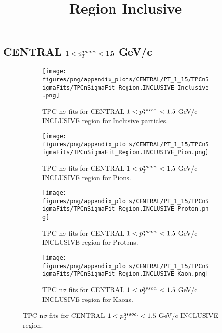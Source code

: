 

    
            \subsection{CENTRAL $1 < \pTassoc < 1.5$ GeV/c}
            \begin{figure}[H]
                \title{Region Inclusive}
                \begin{subfigure}[b]{0.5\textwidth}
                    \centering
                    \texttt{[image: figures/png/appendix\_plots/CENTRAL/PT\_1\_15/TPCnSigmaFits/TPCnSigmaFit\_Region.INCLUSIVE\_Inclusive.png]}
                    \caption{TPC n$\sigma$ fits for CENTRAL $1 < \pTassoc < 1.5$ GeV/c INCLUSIVE region for Inclusive particles.}
                    \label{fig:appendix_CENTRAL_$1 < \pTassoc < 1.5$ GeV/c_INCLUSIVE_Inclusive}
                \end{subfigure}
                \begin{subfigure}[b]{0.5\textwidth}
                    \centering
                    \texttt{[image: figures/png/appendix\_plots/CENTRAL/PT\_1\_15/TPCnSigmaFits/TPCnSigmaFit\_Region.INCLUSIVE\_Pion.png]}
                    \caption{TPC n$\sigma$ fits for CENTRAL $1 < \pTassoc < 1.5$ GeV/c INCLUSIVE region for Pions.}
                    \label{fig:appendix_CENTRAL_$1 < \pTassoc < 1.5$ GeV/c_INCLUSIVE_Pion}
                \end{subfigure}
                \begin{subfigure}[b]{0.5\textwidth}
                    \centering
                    \texttt{[image: figures/png/appendix\_plots/CENTRAL/PT\_1\_15/TPCnSigmaFits/TPCnSigmaFit\_Region.INCLUSIVE\_Proton.png]}
                    \caption{TPC n$\sigma$ fits for CENTRAL $1 < \pTassoc < 1.5$ GeV/c INCLUSIVE region for Protons.}
                    \label{fig:appendix_CENTRAL_$1 < \pTassoc < 1.5$ GeV/c_INCLUSIVE_Proton}
                \end{subfigure}
                \begin{subfigure}[b]{0.5\textwidth}
                    \centering
                    \texttt{[image: figures/png/appendix\_plots/CENTRAL/PT\_1\_15/TPCnSigmaFits/TPCnSigmaFit\_Region.INCLUSIVE\_Kaon.png]}
                    \caption{TPC n$\sigma$ fits for CENTRAL $1 < \pTassoc < 1.5$ GeV/c INCLUSIVE region for Kaons.}
                    \label{fig:appendix_CENTRAL_$1 < \pTassoc < 1.5$ GeV/c_INCLUSIVE_Kaon}
                \end{subfigure}
                \caption{TPC n$\sigma$ fits for CENTRAL $1 < \pTassoc < 1.5$ GeV/c INCLUSIVE region.}
                \label{fig:appendix_CENTRAL_$1 < \pTassoc < 1.5$ GeV/c_INCLUSIVE}
            \end{figure}
